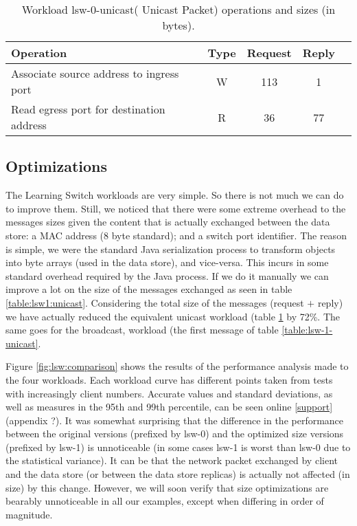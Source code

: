 \begin{table}[ht]
\centering 
\begin{tabular}{l c c c c}
 Operation & Type & Request & Reply  \\ \toprule 
 Associate source address to ingress port & W & 113 & 1\\\midrule
Read egress port for destination address & R & 36 & 77 \\\bottomrule
\end{tabular}
\caption[Workload lsw-0-unicast( Unicast Packet) operations]{Workload lsw-0-unicast( Unicast Packet) operations and sizes (in bytes).}
\label{table:lsw0:unicast}
\end{table}

\subsection{Optimizations}
The Learning Switch workloads are very simple. So there is
not much we can do to improve them. Still, we noticed that there were
some extreme overhead to the messages sizes given the content that is
actually exchanged between the data store: a MAC address (8 byte
standard); and  a switch port identifier. The reason is simple, we
were the standard Java serialization process to
transform objects into byte arrays (used in the data store), and
vice-versa. This incurs in some standard overhead required by the Java
process. If we do it manually we can improve a lot on the size of the
messages exchanged as seen in table
\ref{table:lsw1:unicast}. Considering the total size of the messages
(request $+$ reply) we have actually reduced the equivalent unicast workload (table
\ref{table:lsw0:unicast} by 72\%. The same goes for the broadcast,
workload (the first message of table \ref{table:lsw-1-unicast}. 

Figure \ref{fig:lsw:comparison}  shows the results of the performance
analysis made to the four workloads. Each workload  curve has different points
taken from tests with increasingly client numbers. Accurate values and standard
deviations, as well as measures in the 95th and 99th percentile, can
be seen online \ref{support} (appendix ?).  It was somewhat surprising
that the difference in the performance between the original versions
(prefixed by lsw-0) and the optimized size versions (prefixed by
lsw-1) is unnoticeable (in some cases lsw-1 is worst than lsw-0 due to
the statistical variance). It can be that the network packet exchanged by
client and the data store (or between the data store replicas) is
actually not affected (in size) by this change. However, we will soon
verify that size optimizations are bearably unnoticeable in all our examples, except
when differing in order of magnitude. 

